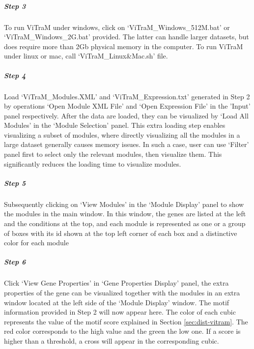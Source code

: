 \begin{small} %

\subparagraph{Step 3} To run ViTraM under windows, click on 
`ViTraM\_Windows\_512M.bat' or `ViTraM\_Windows\_2G.bat' provided.  The latter
can handle larger datasets, but does require more than 2Gb physical memory in
the computer. To run ViTraM under linux or mac, call `ViTraM\_Linux\&Mac.sh'
file.

\subparagraph{Step 4} Load `ViTraM\_Modules.XML' and `ViTraM\_Expression.txt' 
generated in Step 2 by operations `Open Module XML File' and `Open Expression
File' in the 'Input' panel respectively.  After the data are loaded, they can
be visualized by `Load All Modules' in the `Module Selection' panel.  This
extra loading step enables visualizing a subset of modules, where directly
visualizing all the modules in a large dataset generally causes memory issues.
In such a case, user can use `Filter' panel first to select only the relevant
modules, then visualize them. This significantly reduces the loading time to
visualize modules.

\subparagraph{Step 5} Subsequently clicking on `View Modules' in the 
`Module Display' panel to show the modules in the main window.  In this window,
the genes are listed at the left and the conditions at the top, and each module
is represented as one or a group of boxes with its id shown at the top left
corner of each box and a distinctive color for each module

\subparagraph{Step 6} Click `View Gene Properties' in `Gene Properties 
Display' panel, the extra properties of the gene can be visualized together
with the modules in an extra window located at the left side of the `Module
Display' window. 
%
The motif information provided in Step 2 will now appear here.
%
The color of each cubic represents the value of the motif score explained in
Section \ref{sec:dist-vitram}.  The red color corresponds to the high value and
the green the low one. If a score is higher than a threshold, a cross will
appear in the corresponding cubic.



\end{small}
